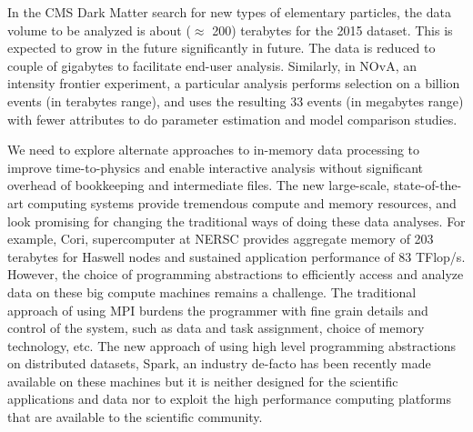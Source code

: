 In the CMS Dark Matter search for new types of elementary particles,
the data volume to be analyzed is about ($\approx$ 200) terabytes for the 2015 dataset. 
 This is expected to grow in the future significantly in future. 
 The data is reduced to couple of gigabytes to facilitate end-user analysis.  
Similarly, in NOvA, an intensity frontier experiment, a particular analysis 
 performs selection on a billion events (in terabytes range), and uses the resulting 33 events (in megabytes range) with fewer 
 attributes to do parameter estimation and model comparison studies. 


We need to explore alternate approaches to in-memory data processing to 
improve time-to-physics and enable interactive analysis without significant overhead of bookkeeping and intermediate 
files. The new large-scale, state-of-the-art computing systems provide tremendous compute and memory resources, and look promising for changing the traditional ways of doing these data analyses. 
For example, Cori, supercomputer at NERSC provides aggregate memory of 203 terabytes for Haswell nodes and sustained application performance of 83 TFlop/s. 
However, the choice of programming abstractions to efficiently access and analyze data on these big compute machines remains a challenge. 
The traditional approach of using MPI burdens the programmer with fine grain details and control of the system, such as data and task assignment, choice of memory technology, etc. The new approach of using high level programming abstractions on distributed datasets, Spark, an industry de-facto has been recently made available on these machines but it is neither designed for the scientific applications and data nor to exploit the high performance computing platforms that are 
available to the scientific community.


